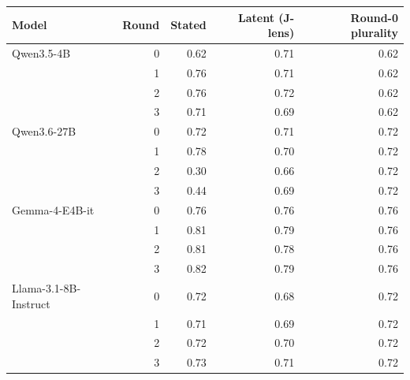 \begin{tabular}{lrrrr}
\toprule
Model & Round & Stated & Latent (J-lens) & Round-0 plurality \\
\midrule
Qwen3.5-4B & 0 & 0.62 & 0.71 & 0.62 \\
 & 1 & 0.76 & 0.71 & 0.62 \\
 & 2 & 0.76 & 0.72 & 0.62 \\
 & 3 & 0.71 & 0.69 & 0.62 \\
Qwen3.6-27B & 0 & 0.72 & 0.71 & 0.72 \\
 & 1 & 0.78 & 0.70 & 0.72 \\
 & 2 & 0.30 & 0.66 & 0.72 \\
 & 3 & 0.44 & 0.69 & 0.72 \\
Gemma-4-E4B-it & 0 & 0.76 & 0.76 & 0.76 \\
 & 1 & 0.81 & 0.79 & 0.76 \\
 & 2 & 0.81 & 0.78 & 0.76 \\
 & 3 & 0.82 & 0.79 & 0.76 \\
Llama-3.1-8B-Instruct & 0 & 0.72 & 0.68 & 0.72 \\
 & 1 & 0.71 & 0.69 & 0.72 \\
 & 2 & 0.72 & 0.70 & 0.72 \\
 & 3 & 0.73 & 0.71 & 0.72 \\
\bottomrule
\end{tabular}
